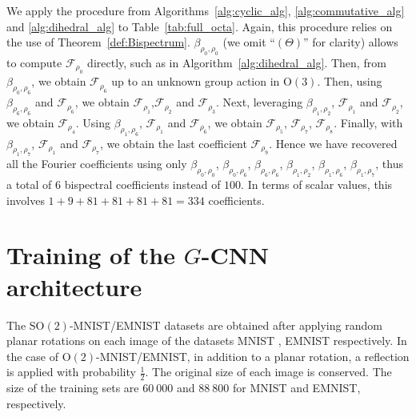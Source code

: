 \documentclass{article}
\theoremstyle{plain}
\theoremstyle{definition}
\theoremstyle{remark}
\begin{document}
We apply the procedure from Algorithms~\ref{alg:cyclic_alg}, \ref{alg:commutative_alg} and \ref{alg:dihedral_alg} to Table~\ref{tab:full_octa}. Again, this procedure relies on the use of Theorem~\ref{def:Bispectrum}. $\beta_{\rho_0,\rho_0}$ (we omit ``$(\Theta)$'' for clarity) allows to compute $\mathcal{F}_{\rho_0}$ directly, such as in Algorithm~\ref{alg:dihedral_alg}. Then, from $\beta_{\rho_0,\rho_6}$, we obtain $\mathcal{F}_{\rho_6}$ up to an unknown group action in $\mathrm{O}(3)$. Then, using $\beta_{\rho_6,\rho_6}$ and $\mathcal{F}_{\rho_6}$, we obtain $\mathcal{F}_{\rho_1}$,$\mathcal{F}_{\rho_2}$ and $\mathcal{F}_{\rho_ 3}$. Next, leveraging $\beta_{\rho_1,\rho_2}$, $\mathcal{F}_{\rho_1}$ and $\mathcal{F}_{\rho_2}$, we obtain  $\mathcal{F}_{\rho_4}$. Using $\beta_{\rho_1,\rho_6}$, $\mathcal{F}_{\rho_1}$ and $\mathcal{F}_{\rho_6}$, we obtain  $\mathcal{F}_{\rho_5}$, $\mathcal{F}_{\rho_7}$, $\mathcal{F}_{\rho_8}$. Finally, with $\beta_{\rho_1,\rho_7}$, $\mathcal{F}_{\rho_1}$ and $\mathcal{F}_{\rho_7}$, we obtain the last coefficient $\mathcal{F}_{\rho_9}$. Hence we have recovered all the Fourier coefficients using only $\beta_{\rho_0,\rho_0}$, $\beta_{\rho_0,\rho_6}$, $\beta_{\rho_6,\rho_6}$, $\beta_{\rho_1,\rho_2}$, $\beta_{\rho_1,\rho_6}$, $\beta_{\rho_1,\rho_7}$, thus a total of $6$ bispectral coefficients instead of $100$. In terms of scalar values, this involves $1+9+81+81+81+81=334$ coefficients.


\section{Training of the $G$-CNN architecture}\label{app:training}
The $\mathrm{SO}(2)$-MNIST/EMNIST datasets are obtained after applying random planar rotations on each image of the datasets MNIST \citep{lecun2010mnist}, EMNIST \citep{cohen2017emnist} respectively. In the case of $\mathrm{O}(2)$-MNIST/EMNIST, in addition to a planar rotation, a reflection is applied with probability $\frac{1}{2}$.  The original size of each image is conserved. The size of the training sets are $60\ 000$ and $88\ 800$ for MNIST and EMNIST, respectively. %
\end{document}
